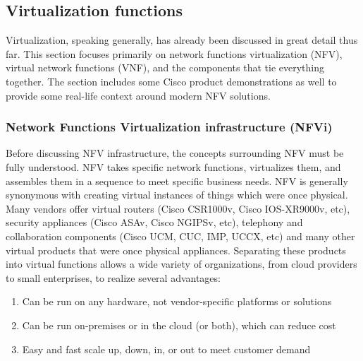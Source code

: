 \subsection{Virtualization functions}
Virtualization, speaking generally, has already been discussed in great detail
thus far. This section focuses primarily on network functions virtualization
(NFV), virtual network functions (VNF), and the components that tie everything
together. The section includes some Cisco product demonstrations as well to
provide some real-life context around modern NFV solutions.

\subsubsection{Network Functions Virtualization infrastructure (NFVi)}
Before discussing NFV infrastructure, the concepts surrounding NFV must be
fully understood. NFV takes specific network functions, virtualizes them, and
assembles them in a sequence to meet specific business needs. NFV is generally
synonymous with creating virtual instances of things which were once physical.
Many vendors offer virtual routers (Cisco CSR1000v, Cisco IOS-XR9000v, etc),
security appliances (Cisco ASAv, Cisco NGIPSv, etc), telephony and
collaboration components (Cisco UCM, CUC, IMP, UCCX, etc) and many other
virtual products that were once physical appliances. Separating these products
into virtual functions allows a wide variety of organizations, from cloud
providers to small enterprises, to realize several advantages:

\begin{enumerate}
  \item Can be run on any hardware, not vendor-specific platforms or solutions
  \item Can be run on-premises or in the cloud (or both), which can reduce cost
  \item Easy and fast scale up, down, in, or out to meet customer demand
\end{enumerate}

